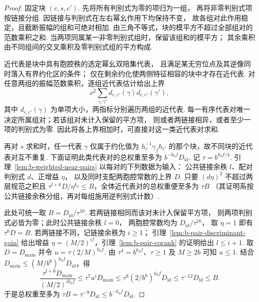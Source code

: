 \begin{proof}
固定块 $(c,s,c')$. 先将所有判别式为零的项归为一组，
再将非零判别式项按链接分组. 因链接与判别式在左右幂幺作用下均保持不变，
故各组对此作用稳定，且截断振幅的组和可绝对相加.
由三角不等式，块的模平方不超过全部组对的范数乘积之和.
当两项同属某一非零判别式组时，保留该组和的模平方；
其余乘积由不同组间的交叉乘积及零判别式组的平方构成.

近代表是块中具有胞腔秩的选定幂幺双陪集代表，
且满足某无穷位点及其逆像同时落入有界约化区的条件；
仅在剩余约化使两侧特征相容的块中才存在近代表.
对任意两组的振幅范数乘积，逐组近代表估计给出上界
\[
 \nu^2\sum_{\gamma,\gamma'}d_{c,c'}(\gamma)d_{c,c'}(\gamma'),
\]
其中 $d_{c,c'}(\gamma)$ 为单项大小，两指标分别遍历两组的近代表.
每一有序代表对唯一决定所属组对；若该组对未计入保留的平方项，
则或者两链接相异，或者至少一项的判别式为零.
因此将各上界相加时，可直接对这一类近代表对求和.

再对 $s$ 求和时，任一代表 $\gamma$ 仅属于约化值为
$h_c^{-1}\gamma_f h_{c'}$ 的那个块，故不同块的近代表对互不重复.
下面证明此类代表对的总权重至多为 $b^{-k_0 f}D_{\mathrm{id}}$.
记 $\tau=b^{k_0 f/4}$.
引理~\ref{lem:b-weighted-near-pairs} 以每对的下列数据为输入：
公共链接余秩 $l$、配对判别式 $d$、正增益 $\eta$，
以及同时支配两胞腔常数的上界 $D$.
只要 $(d\eta)^2$ 不超过两层规范之积且
$\tau^{l+6}D/\eta^{k_0}\le B$，全体近代表对的总权重便至多为 $\tau B$
（其证明系按公共链接余秩分组，再对每组施用逆判别式计数）.

此处可统一取 $B=D_{\mathrm{id}}/\tau^{10}$.
若两链接相同而该对未计入保留平方项，
则两项判别式必皆为零；此时公共链接余秩 $l=0$，
两胞腔常数均为 $D_{\mathrm{id}}/\tau^{16}$，
取 $\eta=1$ 即有 $\tau^6D=B$.
若两链接不同，记链接余秩为 $i\ge1$；
引理~\ref{lem:b-pair-discriminant-gain} 给出增益 $\eta=(M/2)^{if}$，引理~\ref{lem:b-pair-corank} 的证明给出 $l\le i+1$.
取 $D=D_{\mathrm{main}}$ 并令 $u=\tau(2/M)^{k_0 f}$.
由 $\tau^4=b^{k_0f}$、$\tau\ge1$ 及 $M\ge 2b$ 可知 $u\le1$.
结合 $D_{\mathrm{main}}\le(M/b^6)^{k_0f}D_{\mathrm{id}}$，得
\[
 \frac{\tau^{l+6}D_{\mathrm{main}}}{(M/2)^{ik_0f}}
 \le \tau^7 u^iD_{\mathrm{main}}
 \le \tau^8(2/b^6)^{k_0f}D_{\mathrm{id}}
 \le \tau^{-12}D_{\mathrm{id}}\le B.
\]
于是总权重至多为
$\tau B=\tau^{-9}D_{\mathrm{id}}\le b^{-k_0f}D_{\mathrm{id}}$.


\end{proof}
